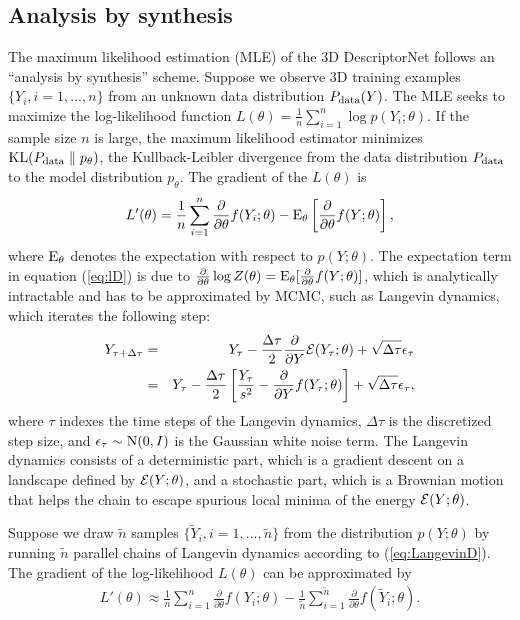 \documentclass[10pt,twocolumn,letterpaper]{article}
\def\E{{\rm E}}
\def\N{{\rm N}}
\def\KL{{\rm KL}}
\def\P{P_{\rm data}}
\def\tY{\tilde{Y}}
\begin{document}
 \subsection{Analysis by synthesis} 
 The maximum likelihood estimation (MLE) of the 3D DescriptorNet follows an ``analysis by synthesis'' scheme. Suppose we observe 3D training examples $\{Y_i, i = 1, ..., n\}$ from an unknown data distribution $\P(Y)$. The MLE seeks to maximize the log-likelihood function 
$   L(\theta) = \frac{1}{n} \sum_{i=1}^{n} \log p(Y_i; \theta). 
$ 
If the sample size $n$ is large, the maximum likelihood estimator minimizes $\KL(\P \parallel p_\theta)$, the Kullback-Leibler divergence from the data distribution $\P$ to the model distribution $p_\theta$. 
The gradient of the $L(\theta)$ is 
  \begin{eqnarray} 
  L'(\theta) = \frac{1}{n} \sum_{i=1}^{n} \frac{\partial}{\partial \theta} f(Y_i; \theta) - \E_{\theta} \left[\frac{\partial}{\partial \theta} f(Y; \theta)\right],  \label{eq:lD}
\end{eqnarray} 
where  $\E_{\theta}$ denotes the expectation with respect to $p(Y; \theta)$. The expectation term in equation (\ref{eq:lD}) is due to
$\frac{\partial}{\partial \theta}  \log Z(\theta) = \E_{\theta}[\frac{\partial}{\partial \theta}  f(Y; \theta)]$, which is analytically intractable and has to be approximated by MCMC, such as Langevin  dynamics,  which iterates the following step: 
\begin{eqnarray}
   Y_{\tau+\Delta \tau} &=& Y_\tau - \frac{\Delta \tau}{2} \frac{\partial}{\partial Y}  {\cal E}(Y_\tau; \theta) + \sqrt{\Delta \tau}\epsilon_{\tau} \nonumber\\ 
   &=& Y_\tau - \frac{\Delta \tau}{2} \left[ \frac{Y_\tau}{s^2} - \frac{\partial}{\partial Y} f(Y_\tau; \theta) \right] + \sqrt{ \Delta \tau}\epsilon_{\tau},
    \label{eq:LangevinD}
\end{eqnarray}
where $\tau$ indexes the time steps of the Langevin dynamics, $\Delta \tau$ is the discretized step size, and $\epsilon_{\tau} \sim \N(0, I)$ is the Gaussian white noise term.  The Langevin dynamics consists of a  deterministic part, which is a gradient descent on a landscape defined by ${\cal E}(Y; \theta)$, and a stochastic part, which is a Brownian motion that helps  the chain to escape spurious local minima of the energy ${\cal E}(Y; \theta)$. 

Suppose we draw $\tilde{n}$ samples $\{ \tY_i, i=1,...,\tilde{n} \}$ from the distribution $p(Y;\theta)$ by running $\tilde{n}$ parallel chains of Langevin dynamics according to (\ref{eq:LangevinD}). The gradient of the log-likelihood $L{(\theta)}$ can be approximated by 
  \begin{eqnarray} 
  L'(\theta) \approx \frac{1}{n} \sum_{i=1}^{n} \frac{\partial}{\partial \theta} f(Y_i; \theta) - \frac{1}{\tilde{n}} \sum_{i=1}^{ \tilde{n} } \frac{\partial}{\partial \theta} f(\tilde Y_i; \theta).  \label{eq:lD2}
\end{eqnarray}
 
\end{document}
